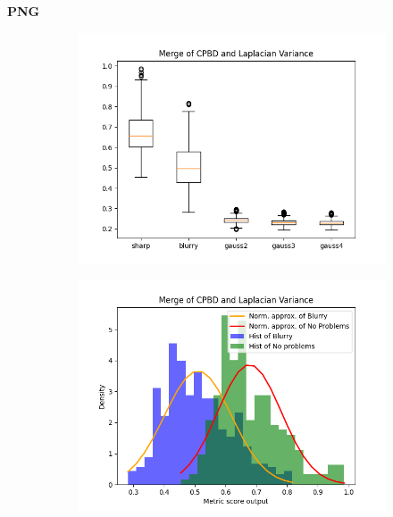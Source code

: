 \textbf{PNG}\\
\begin{figure}[H]
    \centering
    \begin{subfigure}[t]{0.48\textwidth}
        \includegraphics[width=\textwidth]{Figures/cpbd_lv_alpha_6_png/output_boxplot_cpbd_lv.png}
        \caption{}
    \end{subfigure}\hspace{1em}
    \begin{subfigure}[t]{0.48\textwidth}
        \includegraphics[width=\textwidth]{Figures/cpbd_lv_alpha_6_png/output_dens_cpbd_lv.png}
        \caption{}
    \end{subfigure}\hspace{1em}

\end{figure}
